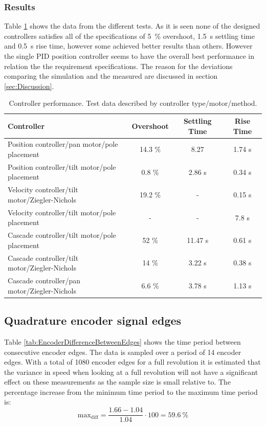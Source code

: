 \documentclass[../../main.tex]{subfiles}
\begin{document}
\subsubsection*{Results}
Table \ref{tab:controller_data} shows the data from the different tests. As it is seen none of the designed controllers satisfies all of the specifications of \SI{5}{\percent} overshoot, \SI{1,5}{\second} settling time and \SI{0,5}{\second} rise time, however some achieved better results than others. However the single PID position controller seems to have the overall best performance in relation the the requirement specifications. The reason for the deviations comparing the simulation and the measured are discussed in section \ref{sec:Discussion}.
\begin{table}[H]
    \centering
    \begin{tabular}{l|c|c|c}
         Controller & Overshoot & Settling Time  & Rise Time \\ \hline
         Position controller/pan motor/pole placement & 14.3 \% & 8.27 & 1.74 s \\
         Position controller/tilt motor/pole placement & 0.8 \% & 2.86 s & 0.34 s \\
         Velocity controller/tilt motor/Ziegler-Nichols & 19.2 \% & - & 0.15 s \\
         Velocity controller/tilt motor/pole placement & - & - & 7.8 s\\
         Cascade controller/tilt motor/pole placement & 52 \%  & 11.47 s  & 0.61 s\\
         Cascade controller/tilt motor/Ziegler-Nichols & 14 \% & 3.22 s & 0.38 s \\
         Cascade controller/pan motor/Ziegler-Nichols & 6.6 \% & 3.78 s & 1.13 s \\
         
    \end{tabular}
    \caption{Controller performance. Test data described by controller type/motor/method.}
    \label{tab:controller_data}
\end{table}

\subsection{Quadrature encoder signal edges}
Table \ref{tab:EncoderDifferenceBetweenEdges} shows the time period between consecutive encoder edges. The data is sampled over a period of 14 encoder edges. With a total of 1080 encoder edges for a full revolution it is estimated that the variance in speed when looking at a full revolution will not have a significant effect on these measurements as the sample size is small relative to. The percentage increase from the minimum time period to the maximum time period is:
\begin{equation}
    \mathrm{max_{diff}} = \frac{1.66 - 1.04}{1.04} \cdot 100 = \SI{59.6}{\percent} 
\end{equation}
\end{document}
